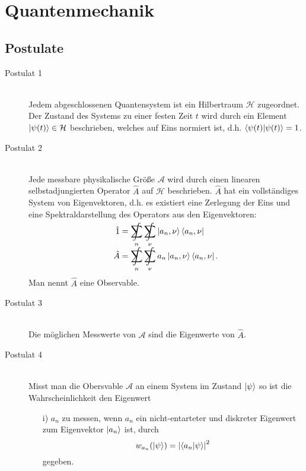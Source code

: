 \section{Quantenmechanik}
	\subsection{Postulate}
		\begin{description} %
			\item[Postulat 1]\hfill \\
				Jedem abgeschlossenen Quantensystem ist ein Hilbertraum $\mathcal{H}$ zugeordnet. Der Zustand des Systems zu einer festen Zeit $t$ wird durch ein Element $\Ket{\psi(t)} \in \mathcal{H}$ beschrieben, welches auf Eins normiert ist, d.h. $\braket{\psi(t)|\psi(t)} = 1$.
			\item[Postulat 2]\hfill \\
				Jede messbare physikalische Größe $\mathcal{A}$ wird durch einen linearen selbstadjungierten Operator $\hat{A}$ auf $\mathcal{H}$ beschrieben. $\hat{A}$ hat ein vollständiges System von Eigenvektoren, d.h. es existiert eine Zerlegung der Eins und eine Spektraldarstellung des Operators aus den Eigenvektoren:
				\begin{equation}
					\begin{aligned}
						\hat{1} &= \SumInt_n \SumInt_\nu \Ket{a_n,\nu}\Bra{a_n,\nu} \\
						\hat{A} &= \SumInt_n \SumInt_\nu a_n\Ket{a_n,\nu}\Bra{a_n,\nu}. \\
					\end{aligned}
				\end{equation}
				Man nennt $\hat{A}$ eine Observable.
			\item[Postulat 3]\hfill \\
				Die möglichen Messwerte von $\mathcal{A}$ sind die Eigenwerte von $\hat{A}$.
			\item[Postulat 4]\hfill \\
				Misst man die Obersvable $\mathcal{A}$ an einem System im Zustand $\Ket{\psi}$ so ist die Wahrscheinlichkeit den Eigenwert
				\begin{itemize}
					\item[i)] $a_n$ zu messen, wenn $a_n$ ein nicht-entarteter und diskreter Eigenwert zum Eigenvektor $\Ket{a_n}$ ist, durch
					\begin{equation}
						w_{a_n}(\Ket{\psi}) = \left| \braket{a_n|\psi} \right|^2
					\end{equation}
					gegeben.

\end{itemize}
\end{description}
